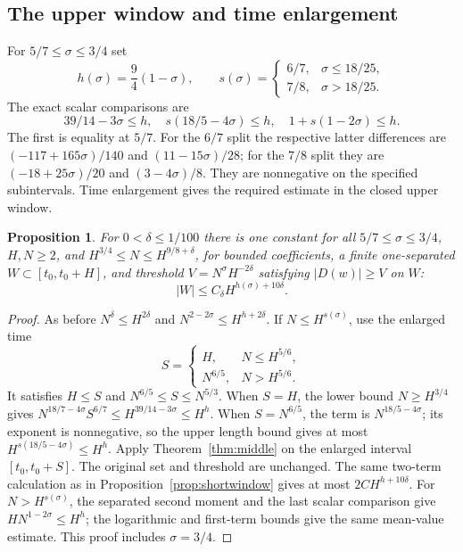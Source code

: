 \documentclass[11pt,a4paper,oneside]{article}
\newtheorem{proposition}[theorem]{Proposition}
\theoremstyle{definition}
\newcommand{\N}{\mathbb N}
\numberwithin{equation}{section}
\begin{document}
\subsection{The upper window and time enlargement}
For $5/7\le\sigma\le3/4$ set
\[
 h(\sigma)=\frac94(1-\sigma),\qquad
 s(\sigma)=\begin{cases}6/7,&\sigma\le18/25,\\7/8,&\sigma>18/25.\end{cases}
\]
The exact scalar comparisons are
\[
 39/14-3\sigma\le h,\quad
 s(18/5-4\sigma)\le h,\quad1+s(1-2\sigma)\le h.
\]
The first is equality at $5/7$. For the $6/7$ split the respective latter
differences are $(-117+165\sigma)/140$ and $(11-15\sigma)/28$;
for the $7/8$ split they are $(-18+25\sigma)/20$ and $(3-4\sigma)/8$.
They are nonnegative on the specified subintervals.
Time enlargement gives the required estimate in the closed upper window.
\begin{proposition}\label{prop:upperwindow}
For $0<\delta\le1/100$ there is one constant for all
$5/7\le\sigma\le3/4$, $H,N\ge2$, and
$H^{3/4}\le N\le H^{9/8+\delta}$, for bounded coefficients, a finite one-separated $W\subset[t_0,t_0+H]$, and threshold $V=N^\sigma H^{-2\delta}$ satisfying $|D(w)|\ge V$ on $W$:
\[
 |W|\le C_\delta H^{h(\sigma)+10\delta}.
\]
\end{proposition}
\begin{proof}
As before $N^\delta\le H^{2\delta}$ and
$N^{2-2\sigma}\le H^{h+2\delta}$.
If $N\le H^{s(\sigma)}$, use the enlarged time
\[
 S=\begin{cases}H,&N\le H^{5/6},\\N^{6/5},&N>H^{5/6}.\end{cases}
\]
It satisfies $H\le S$ and $N^{6/5}\le S\le N^{5/3}$.
When $S=H$, the lower bound $N\ge H^{3/4}$ gives
$N^{18/7-4\sigma}S^{6/7}\le H^{39/14-3\sigma}\le H^h$.
When $S=N^{6/5}$, the term is $N^{18/5-4\sigma}$; its exponent is
nonnegative, so the upper length bound gives at most
$H^{s(18/5-4\sigma)}\le H^h$.
Apply Theorem~\ref{thm:middle} on the enlarged interval
$[t_0,t_0+S]$. The original set and threshold are unchanged.
The same two-term calculation as in Proposition~\ref{prop:shortwindow}
gives at most $2C H^{h+10\delta}$.
For $N>H^{s(\sigma)}$, the separated second moment and the last scalar
comparison give $HN^{1-2\sigma}\le H^h$; the logarithmic and first-term
bounds give the same mean-value estimate. This proof includes $\sigma=3/4$.
\end{proof}
\end{document}
